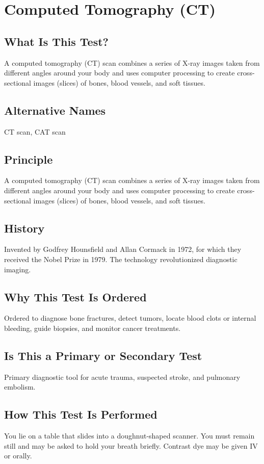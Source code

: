\chapter{Computed Tomography (CT)}

\section*{What Is This Test?}
A computed tomography (CT) scan combines a series of X-ray images taken from different angles around your body and uses computer processing to create cross-sectional images (slices) of bones, blood vessels, and soft tissues.

\section*{Alternative Names}
CT scan, CAT scan

\section*{Principle}
A computed tomography (CT) scan combines a series of X-ray images taken from different angles around your body and uses computer processing to create cross-sectional images (slices) of bones, blood vessels, and soft tissues.

\section*{History}
Invented by Godfrey Hounsfield and Allan Cormack in 1972, for which they received the Nobel Prize in 1979. The technology revolutionized diagnostic imaging.

\section*{Why This Test Is Ordered}
Ordered to diagnose bone fractures, detect tumors, locate blood clots or internal bleeding, guide biopsies, and monitor cancer treatments.

\section*{Is This a Primary or Secondary Test}
Primary diagnostic tool for acute trauma, suspected stroke, and pulmonary embolism.

\section*{How This Test Is Performed}
You lie on a table that slides into a doughnut-shaped scanner. You must remain still and may be asked to hold your breath briefly. Contrast dye may be given IV or orally.

